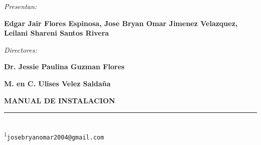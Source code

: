 \begin{titlepage}
\begin{center}
			{\fontsize{14}{16}\selectfont \textit{Presentan:}\par}
			\vspace{0.15cm}
			{\fontsize{14}{16}\selectfont \textbf{Edgar Jair Flores Espinosa, Jose Bryan Omar Jimenez Velazquez, Leilani Shareni Santos Rivera}\par}
			
			\vspace{1.35cm}
			
			{\fontsize{14}{16}\selectfont \textit{Directores:}\par}
			
			\vspace{0.45cm}
			
			{\fontsize{14}{16}\selectfont \textbf{Dr. Jessie Paulina Guzman Flores}\par}
			{\fontsize{14}{16}\selectfont \textbf{M. en C. Ulises Velez Saldaña}\par}
						
			\vspace{1.1cm}
			
			{\fontsize{14}{16}\selectfont \textbf{MANUAL DE INSTALACION}\par}
			
		\end{center}
		
		\vspace{0.25cm}
		
		\vfill
		
		{\fontsize{12}{14}\selectfont
			\rule{6cm}{0.4pt}\\[-0.05cm]
			\textsuperscript{1}\texttt{josebryanomar2004@gmail.com}
		}
		
	\end{titlepage}
